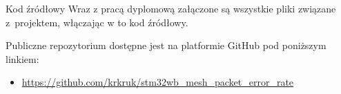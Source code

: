 \begin{easyappendix}{Kod źródłowy}
Wraz z pracą dyplomową załączone są wszystkie pliki związane z~projektem, włączając w to kod źródłowy.

Publiczne repozytorium dostępne jest na platformie GitHub pod poniższym linkiem:
\begin{itemize}
	\item \url{https://github.com/krkruk/stm32wb_mesh_packet_error_rate}
\end{itemize}

\end{easyappendix}
